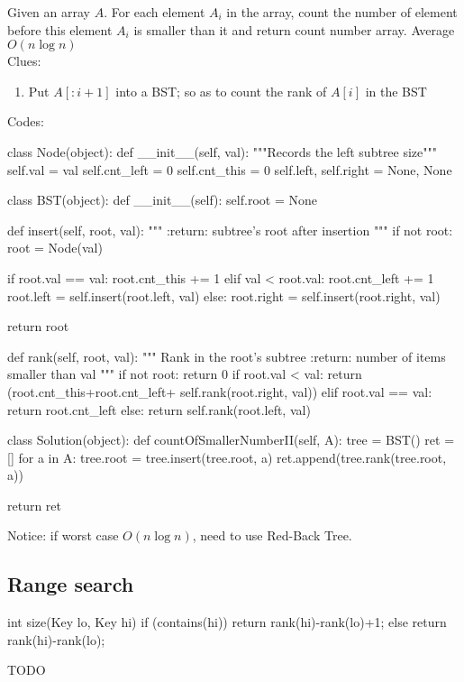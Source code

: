  Given an array $A$. For each element $A_i$ in the array, count the number of element before this element $A_i$ is smaller than it and return count number array. Average $O(n \log n)$
\\
Clues:
\begin{enumerate}
\item Put $A[:i+1]$ into a BST; so as to count the rank of $A[i]$ in the BST
\end{enumerate}
Codes:
\begin{python}
class Node(object):
  def __init__(self, val):
    """Records the left subtree size"""
    self.val = val
    self.cnt_left = 0
    self.cnt_this = 0
    self.left, self.right = None, None


class BST(object):
  def __init__(self):
    self.root = None

  def insert(self, root, val):
    """
    :return: subtree's root after insertion
    """
    if not root:
      root = Node(val)

    if root.val == val:
      root.cnt_this += 1
    elif val < root.val:
      root.cnt_left += 1
      root.left = self.insert(root.left, val)
    else:
      root.right = self.insert(root.right, val)

    return root

  def rank(self, root, val):
    """
    Rank in the root's subtree
    :return: number of items smaller than val
    """
    if not root:
      return 0
    if root.val < val:
      return (root.cnt_this+root.cnt_left+
              self.rank(root.right, val))
    elif root.val == val:
      return root.cnt_left
    else:
      return self.rank(root.left, val)


class Solution(object):
  def countOfSmallerNumberII(self, A):
    tree = BST()
    ret = []
    for a in A:
      tree.root = tree.insert(tree.root, a)
      ret.append(tree.rank(tree.root, a))

    return ret
\end{python}
Notice: if worst case $O(n \log n)$, need to use Red-Back Tree.


\subsection{Range search}
\begin{java}
int size(Key lo, Key hi) {
    if (contains(hi)) return rank(hi)-rank(lo)+1;
    else              return rank(hi)-rank(lo);
}
\end{java}
TODO

